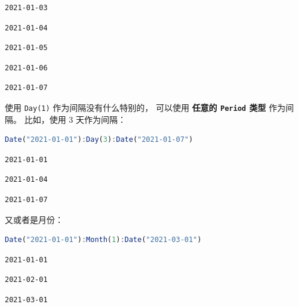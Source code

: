 \documentclass[
  notoc %
]{tufte-book}
\newcommand{\passthrough}[1]{#1}
\begin{document}
\begin{lstlisting}[language=Output]
2021-01-03
\end{lstlisting}

\begin{lstlisting}[language=Output]
2021-01-04
\end{lstlisting}

\begin{lstlisting}[language=Output]
2021-01-05
\end{lstlisting}

\begin{lstlisting}[language=Output]
2021-01-06
\end{lstlisting}

\begin{lstlisting}[language=Output]
2021-01-07
\end{lstlisting}

使用 \passthrough{\lstinline!Day(1)!} 作为间隔没有什么特别的， 可以使用
\textbf{任意的 \passthrough{\lstinline!Period!} 类型} 作为间隔。
比如，使用 3 天作为间隔：

\begin{lstlisting}[language=Julia]
Date("2021-01-01"):Day(3):Date("2021-01-07")
\end{lstlisting}

\begin{lstlisting}[language=Output]
2021-01-01
\end{lstlisting}

\begin{lstlisting}[language=Output]
2021-01-04
\end{lstlisting}

\begin{lstlisting}[language=Output]
2021-01-07
\end{lstlisting}

又或者是月份：

\begin{lstlisting}[language=Julia]
Date("2021-01-01"):Month(1):Date("2021-03-01")
\end{lstlisting}

\begin{lstlisting}[language=Output]
2021-01-01
\end{lstlisting}

\begin{lstlisting}[language=Output]
2021-02-01
\end{lstlisting}

\begin{lstlisting}[language=Output]
2021-03-01
\end{lstlisting}
\end{document}
